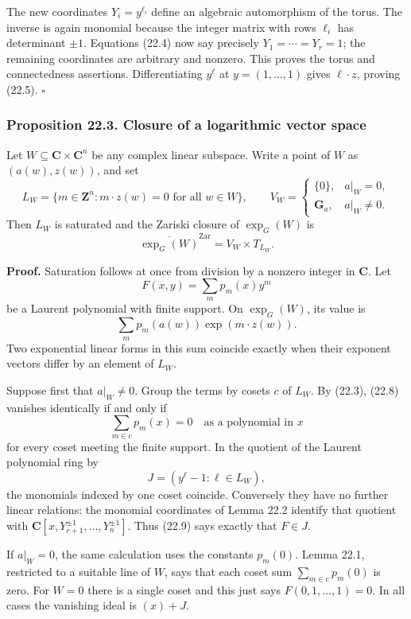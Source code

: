 \documentclass[
  11pt,
  a4paper,
]{article}
\begin{document}
The new coordinates \(Y_i=y^{\ell_i}\) define an algebraic automorphism
of the torus. The inverse is again monomial because the integer matrix
with rows \(\ell_i\) has determinant \(\pm1\). Equations (22.4) now say
precisely \(Y_1=\cdots=Y_r=1\); the remaining coordinates are arbitrary
and nonzero. This proves the torus and connectedness assertions.
Differentiating \(y^\ell\) at \(y=(1,\ldots,1)\) gives \(\ell\cdot z\),
proving (22.5). \(\square\)

\subsubsection{Proposition 22.3. Closure of a logarithmic vector
space}\label{proposition-22.3.-closure-of-a-logarithmic-vector-space}

Let \(W\subseteq\mathbf C\times\mathbf C^n\) be any complex linear
subspace. Write a point of \(W\) as \((a(w),z(w))\), and set \[
 L_W=\{m\in\mathbf Z^n:m\cdot z(w)=0\text{ for all }w\in W\},
 \qquad
 V_W=\begin{cases}\{0\},&a|_W=0,\\\mathbf G_a,&a|_W\ne0.\end{cases}
 \tag{22.6}
\] Then \(L_W\) is saturated and the Zariski closure of \(\exp_G(W)\) is
\[
 \overline{\exp_G(W)}^{\mathrm{Zar}}=V_W\times T_{L_W}.
 \tag{22.7}
\]

\textbf{Proof.} Saturation follows at once from division by a nonzero
integer in \(\mathbf C\). Let \[
 F(x,y)=\sum_m p_m(x)y^m
\] be a Laurent polynomial with finite support. On \(\exp_G(W)\), its
value is \[
 \sum_m p_m(a(w))\exp(m\cdot z(w)).
 \tag{22.8}
\] Two exponential linear forms in this sum coincide exactly when their
exponent vectors differ by an element of \(L_W\).

Suppose first that \(a|_W\ne0\). Group the terms by cosets \(c\) of
\(L_W\). By (22.3), (22.8) vanishes identically if and only if \[
 \sum_{m\in c}p_m(x)=0\quad\text{as a polynomial in }x
 \tag{22.9}
\] for every coset meeting the finite support. In the quotient of the
Laurent polynomial ring by \[
 J=(y^\ell-1:\ell\in L_W),
\] the monomials indexed by one coset coincide. Conversely they have no
further linear relations: the monomial coordinates of Lemma 22.2
identify that quotient with
\(\mathbf C[x,Y_{r+1}^{\pm1},\ldots,Y_n^{\pm1}]\). Thus (22.9) says
exactly that \(F\in J\).

If \(a|_W=0\), the same calculation uses the constants \(p_m(0)\). Lemma
22.1, restricted to a suitable line of \(W\), says that each coset sum
\(\sum_{m\in c}p_m(0)\) is zero. For \(W=0\) there is a single coset and
this just says \(F(0,1,\ldots,1)=0\). In all cases the vanishing ideal
is \((x)+J\).
\end{document}

